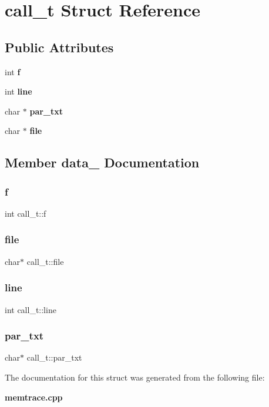 \section{call\+\_\+t Struct Reference}
\label{structcall__t}
\subsection*{Public Attributes}
\begin{DoxyCompactItemize}
\item 
int \textbf{ f}
\item 
int \textbf{ line}
\item 
char $\ast$ \textbf{ par\+\_\+txt}
\item 
char $\ast$ \textbf{ file}
\end{DoxyCompactItemize}


\subsection{Member data_ Documentation}
\mbox{\label{structcall__t_a59d4e803f2e254dc5ceeb9c1bfcc9355}} 
\subsubsection{f}
{\footnotesize\ttfamily int call\+\_\+t\+::f}

\mbox{\label{structcall__t_a97629ec51d024396221fe7d48c84859a}} 
\subsubsection{file}
{\footnotesize\ttfamily char$\ast$ call\+\_\+t\+::file}

\mbox{\label{structcall__t_aaa4f0e556289bbf4da414897b10e0916}} 
\subsubsection{line}
{\footnotesize\ttfamily int call\+\_\+t\+::line}

\mbox{\label{structcall__t_a24e185188a17e272396e118640672aba}} 
\subsubsection{par\+\_\+txt}
{\footnotesize\ttfamily char$\ast$ call\+\_\+t\+::par\+\_\+txt}



The documentation for this struct was generated from the following file\+:\begin{DoxyCompactItemize}
\item 
\textbf{ memtrace.\+cpp}\end{DoxyCompactItemize}
